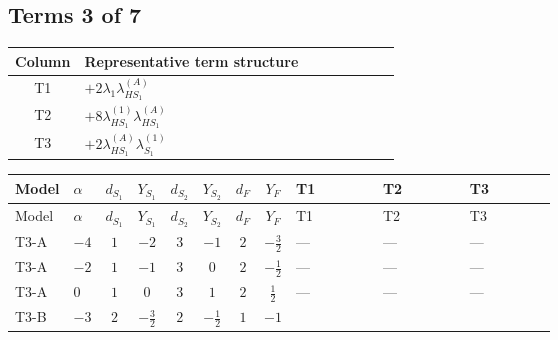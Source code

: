 \documentclass[8pt]{article}
\begin{document}
\begin{landscape}
\subsection*{Terms 3 of 7}
\begin{center}
\begin{tabular}{@{}c >{\raggedright\arraybackslash}p{0.82\linewidth}@{}}
\toprule
Column & Representative term structure \\
\midrule
T1 & \(\displaystyle +2 {\lambda_1} {\lambda_{HS_1}^{(A)}}\) \\
\midrule
T2 & \(\displaystyle +8 {\lambda_{HS_1}^{(1)}} {\lambda_{HS_1}^{(A)}}\) \\
\midrule
T3 & \(\displaystyle +2 {\lambda_{HS_1}^{(A)}} {\lambda_{S_1}^{(1)}}\) \\
\midrule
\bottomrule
\end{tabular}
\end{center}
\smallskip
\tiny
\begin{longtable}{@{}llcccccc >{\raggedright\arraybackslash}p{0.21\linewidth} >{\raggedright\arraybackslash}p{0.21\linewidth} >{\raggedright\arraybackslash}p{0.21\linewidth}@{}}
\toprule
Model & $\alpha$ & $d_{S_1}$ & $Y_{S_1}$ & $d_{S_2}$ & $Y_{S_2}$ & $d_F$ & $Y_F$ & T1 & T2 & T3 \\
\midrule
\endfirsthead
\toprule
Model & $\alpha$ & $d_{S_1}$ & $Y_{S_1}$ & $d_{S_2}$ & $Y_{S_2}$ & $d_F$ & $Y_F$ & T1 & T2 & T3 \\
\midrule
\endhead
T3-A & $-4$ & $1$ & $-2$ & $3$ & $-1$ & $2$ & $-\frac{3}{2}$ & --- & --- & --- \\
\midrule
T3-A & $-2$ & $1$ & $-1$ & $3$ & $0$ & $2$ & $-\frac{1}{2}$ & --- & --- & --- \\
\midrule
T3-A & $0$ & $1$ & $0$ & $3$ & $1$ & $2$ & $\frac{1}{2}$ & --- & --- & --- \\
\midrule
T3-B & $-3$ & $2$ & $-\frac{3}{2}$ & $2$ & $-\frac{1}{2}$ & $1$ & $-1$ & \scriptsize\adjustbox{max width=\linewidth}{$\begin{gathered} +2 {\lambda_1} {\lambda_{HS_1}^{(A)}}\end{gathered}$} & \scriptsize\adjustbox{max width=\linewidth}{$\begin{gathered} +8 {\lambda_{HS_1}^{(1)}} {\lambda_{HS_1}^{(A)}}\end{gathered}$} & \scriptsize\adjustbox{max width=\linewidth}{$\begin{gathered} +2 {\lambda_{HS_1}^{(A)}} {\lambda_{S_1}^{(1)}}\end{gathered}$} \\

\end{longtable}
\end{landscape}
\end{document}
